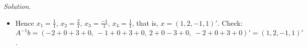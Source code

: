\documentclass[12pt]{article}
\theoremstyle{definition}
\newenvironment{solution}{\par\noindent\textit{Solution.}\ }{\par\smallskip}
\begin{document}
\begin{solution}
\begin{itemize}
\[\begin{aligned}
\det A_4&=1\cdot(-1)^{2+1}\det\begin{pmatrix}-1&2&-1\\-2&3&-3\\0&1&0\end{pmatrix}
+1\cdot(-1)^{2+3}\det\begin{pmatrix}3&-1&-1\\4&-2&-3\\0&0&0\end{pmatrix}=-(-1)-0=1
\end{aligned}
\]
Here the \(3\times3\) determinants with the third column \((0,0,1)'\) are \(2\times2\) determinants, as in (a); the last
one has a zero row, so it is \(0\) (Theorem~\ref{r5d-thm-basic}(b)); and the one before it, along its third row
\((0,1,0)\), is \((-1)^{3+2}\det\left(\begin{smallmatrix}-1&-1\\-2&-3\end{smallmatrix}\right)=-(3-2)=-1\).
\item Hence \(x_1=\frac11\), \(x_2=\frac21\), \(x_3=\frac{-1}1\), \(x_4=\frac11\), that is, \(x=(1,2,-1,1)'\). Check:
\(A^{-1}b=(-2+0+3+0,\ -1+0+3+0,\ 2+0-3+0,\ -2+0+3+0)'=(1,2,-1,1)'\).
\end{itemize}
\end{solution}
\end{document}
